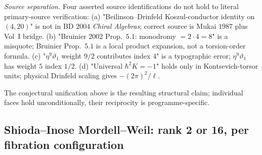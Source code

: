 \begin{theorem}
\emph{Source separation.} Four asserted source identifications do not
hold to literal primary-source verification:
(a) "Beilinson--Drinfeld Koszul-conductor identity on $(4, 20)$" is
not in BD $2004$ \emph{Chiral Algebras}; correct source is Mukai $1987$
plus Vol~I bridge.
(b) "Bruinier $2002$ Prop.~$5.1$: monodromy $= 2 \cdot 4 = 8$" is a
misquote; Bruinier Prop.~$5.1$ is a local product expansion, not a
torsion-order formula.
(c) "$\eta^9\vartheta_1$ weight $9/2$ contributes index $4$" is a
typographic error; $\eta^9 \vartheta_1$ has weight $5$ index $1/2$.
(d) "Universal $\hbar^2 K = -1$" holds only in Kontsevich-torsor units;
physical Drinfeld scaling gives $-(2\pi)^2 / \ell$.

The conjectural unification above is the resulting structural claim;
individual faces hold unconditionally, their reciprocity is
programme-specific.
\end{theorem}

\subsection{Shioda--Inose Mordell--Weil: rank 2 or 16, per fibration
configuration}
\label{wn:subsec:second-pass-shioda-inose-MW}

